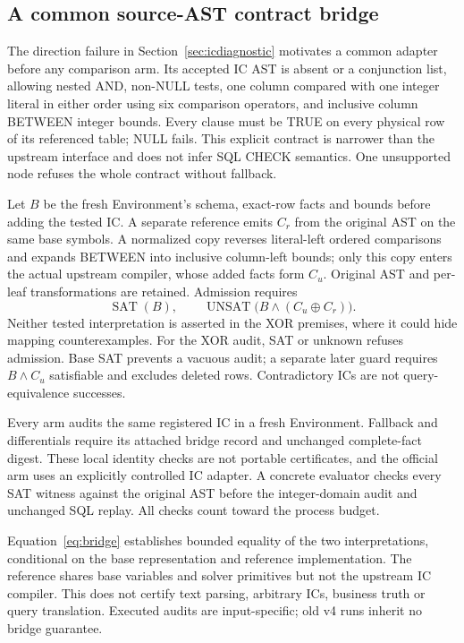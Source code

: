 \subsection{A common source-AST contract bridge}\label{sec:bridge}
The direction failure in Section~\ref{sec:icdiagnostic} motivates a common adapter before any comparison arm. Its accepted IC AST is absent or a conjunction list, allowing nested AND, non-NULL tests, one column compared with one integer literal in either order using six comparison operators, and inclusive column BETWEEN integer bounds. Every clause must be TRUE on every physical row of its referenced table; NULL fails. This explicit contract is narrower than the upstream interface and does not infer SQL CHECK semantics. One unsupported node refuses the whole contract without fallback.

Let $B$ be the fresh Environment's schema, exact-row facts and bounds before adding the tested IC. A separate reference emits $C_r$ from the original AST on the same base symbols. A normalized copy reverses literal-left ordered comparisons and expands BETWEEN into inclusive column-left bounds; only this copy enters the actual upstream compiler, whose added facts form $C_u$. Original AST and per-leaf transformations are retained. Admission requires
\begin{equation}
\operatorname{SAT}(B),\qquad
\operatorname{UNSAT}\bigl(B\land(C_u\mathbin{\oplus}C_r)\bigr).
\label{eq:bridge}
\end{equation}
Neither tested interpretation is asserted in the XOR premises, where it could hide mapping counterexamples. For the XOR audit, SAT or unknown refuses admission. Base SAT prevents a vacuous audit; a separate later guard requires $B\land C_u$ satisfiable and excludes deleted rows. Contradictory ICs are not query-equivalence successes.

Every arm audits the same registered IC in a fresh Environment. Fallback and differentials require its attached bridge record and unchanged complete-fact digest. These local identity checks are not portable certificates, and the official arm uses an explicitly controlled IC adapter. A concrete evaluator checks every SAT witness against the original AST before the integer-domain audit and unchanged SQL replay. All checks count toward the process budget.

Equation~\ref{eq:bridge} establishes bounded equality of the two interpretations, conditional on the base representation and reference implementation. The reference shares base variables and solver primitives but not the upstream IC compiler. This does not certify text parsing, arbitrary ICs, business truth or query translation. Executed audits are input-specific; old v4 runs inherit no bridge guarantee.
